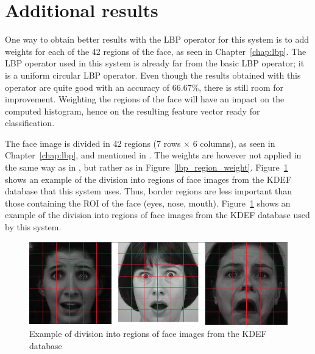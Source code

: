 \section{Additional results}

\vspace{\baselineskip}
\noindent One way to obtain better results with the LBP operator for this system is to add weights for each of the 42 regions of the face, as seen in Chapter~\ref{chap:lbp}. The LBP operator used in this system is already far from the basic LBP operator; it is a uniform circular LBP operator. Even though the results obtained with this operator are quite good with an accuracy of $ 66.67\% $, there is still room for improvement. Weighting the regions of the face will have an impact on the computed histogram, hence on the resulting feature vector ready for classification. \newline

\noindent The face image is divided in 42 regions ($ 7 $ rows $\times$ $ 6 $ columns), as seen in Chapter~\ref{chap:lbp}, and mentioned in \cite{GAN08}. The weights are however not applied in the same way as in \cite{GAN08}, but rather as in Figure~\ref{lbp_region_weight}. Figure~\ref{implementation_weight_example} shows an example of the division into regions of face images from the KDEF database that this system uses. Thus, border regions are less important than those containing the ROI of the face (eyes, nose, mouth). Figure~\ref{implementation_weight_example} shows an example of the division into regions of face images from the KDEF database used by this system.
\newline

\begin{figure}[!h]
\begin{center}
\noindent \includegraphics[scale=0.3]{figures/implementation_weight_example} 
\newline
\caption{Example of division into regions of face images from the KDEF database}
\label{implementation_weight_example}
\end{center} 
\end{figure}

